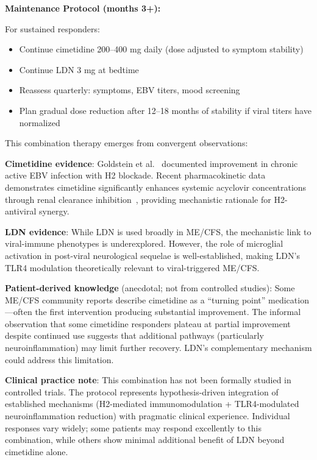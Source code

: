 \begin{protocol}
\textbf{Maintenance Protocol (months 3+):}

For sustained responders:
\begin{itemize}
    \item Continue cimetidine 200--400 mg daily (dose adjusted to symptom stability)
    \item Continue LDN 3 mg at bedtime
    \item Reassess quarterly: symptoms, EBV titers, mood screening
    \item Plan gradual dose reduction after 12--18 months of stability if viral titers have normalized
\end{itemize}

\end{protocol}

\begin{observation}
\label{obs:cimetidine-ldn-precedent}

This combination therapy emerges from convergent observations:

\textbf{Cimetidine evidence}: Goldstein et al.~\cite{Goldstein1986CimetidineEBV} documented improvement in chronic active EBV infection with H2 blockade. Recent pharmacokinetic data demonstrates cimetidine significantly enhances systemic acyclovir concentrations through renal clearance inhibition~\cite{Stuijt2026CimetidineAcyclovir}, providing mechanistic rationale for H2-antiviral synergy.

\textbf{LDN evidence}: While LDN is used broadly in ME/CFS, the mechanistic link to viral-immune phenotypes is underexplored. However, the role of microglial activation in post-viral neurological sequelae is well-established, making LDN's TLR4 modulation theoretically relevant to viral-triggered ME/CFS.

\textbf{Patient-derived knowledge} (anecdotal; not from controlled studies): Some ME/CFS community reports describe cimetidine as a ``turning point'' medication---often the first intervention producing substantial improvement. The informal observation that some cimetidine responders plateau at partial improvement despite continued use suggests that additional pathways (particularly neuroinflammation) may limit further recovery. LDN's complementary mechanism could address this limitation.

\textbf{Clinical practice note}: This combination has not been formally studied in controlled trials. The protocol represents hypothesis-driven integration of established mechanisms (H2-mediated immunomodulation + TLR4-modulated neuroinflammation reduction) with pragmatic clinical experience. Individual responses vary widely; some patients may respond excellently to this combination, while others show minimal additional benefit of LDN beyond cimetidine alone.

\end{observation}

